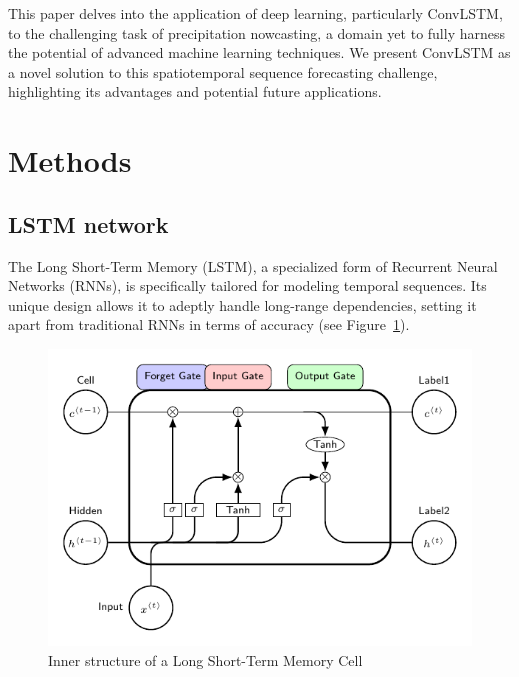 \documentclass[
]{agujournal2019}
\begin{document}
This paper delves into the application of deep learning, particularly
ConvLSTM, to the challenging task of precipitation nowcasting, a domain
yet to fully harness the potential of advanced machine learning
techniques. We present ConvLSTM as a novel solution to this
spatiotemporal sequence forecasting challenge, highlighting its
advantages and potential future applications.

\hypertarget{methods}{%
\section{Methods}\label{methods}}

\hypertarget{lstm-network}{%
\subsection{LSTM network}\label{lstm-network}}

The Long Short-Term Memory (LSTM), a specialized form of Recurrent
Neural Networks (RNNs), is specifically tailored for modeling temporal
sequences. Its unique design allows it to adeptly handle long-range
dependencies, setting it apart from traditional RNNs in terms of
accuracy (see Figure~\ref{fig-lstm}).

\begin{figure}

{\centering \includegraphics{draw_lstm.pdf}

}

\caption{\label{fig-lstm}Inner structure of a Long Short-Term Memory
Cell}

\end{figure}
\end{document}
